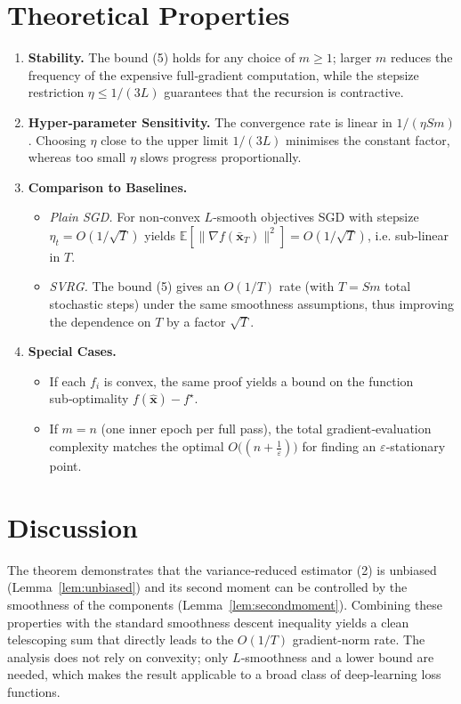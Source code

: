 \documentclass{article}
\begin{document}
\section*{Theoretical Properties}
\begin{enumerate}[label=\arabic*.]
\item \textbf{Stability.} The bound (5) holds for any choice of $m\ge 1$; larger $m$ reduces the frequency of the expensive full‑gradient computation, while the stepsize restriction $\eta\le 1/(3L)$ guarantees that the recursion is contractive.
\item \textbf{Hyper‑parameter Sensitivity.} The convergence rate is linear in $1/(\eta S m)$.  Choosing $\eta$ close to the upper limit $1/(3L)$ minimises the constant factor, whereas too small $\eta$ slows progress proportionally.
\item \textbf{Comparison to Baselines.}
\begin{itemize}
\item \emph{Plain SGD.} For non‑convex $L$‑smooth objectives SGD with stepsize $\eta_t=O(1/\sqrt{T})$ yields $\mathbb{E}[\|\nabla f(\bar{\mathbf{x}}_T)\|^{2}]=O(1/\sqrt{T})$, i.e. sub‑linear in $T$.
\item \emph{SVRG.} The bound (5) gives an $O(1/T)$ rate (with $T=S m$ total stochastic steps) under the same smoothness assumptions, thus improving the dependence on $T$ by a factor $\sqrt{T}$.
\end{itemize}
\item \textbf{Special Cases.}
\begin{itemize}
\item If each $f_i$ is convex, the same proof yields a bound on the function sub‑optimality $f(\widehat{\mathbf{x}})-f^\star$.
\item If $m=n$ (one inner epoch per full pass), the total gradient‑evaluation complexity matches the optimal $O\bigl((n+\frac{1}{\varepsilon})\bigr)$ for finding an $\varepsilon$‑stationary point.
\end{itemize}
\end{enumerate}

\section*{Discussion}
The theorem demonstrates that the variance‑reduced estimator (2) is unbiased (Lemma~\ref{lem:unbiased}) and its second moment can be controlled by the smoothness of the components (Lemma~\ref{lem:secondmoment}).  Combining these properties with the standard smoothness descent inequality yields a clean telescoping sum that directly leads to the $O(1/T)$ gradient‑norm rate.  The analysis does not rely on convexity; only $L$‑smoothness and a lower bound are needed, which makes the result applicable to a broad class of deep‑learning loss functions.
\end{document}
